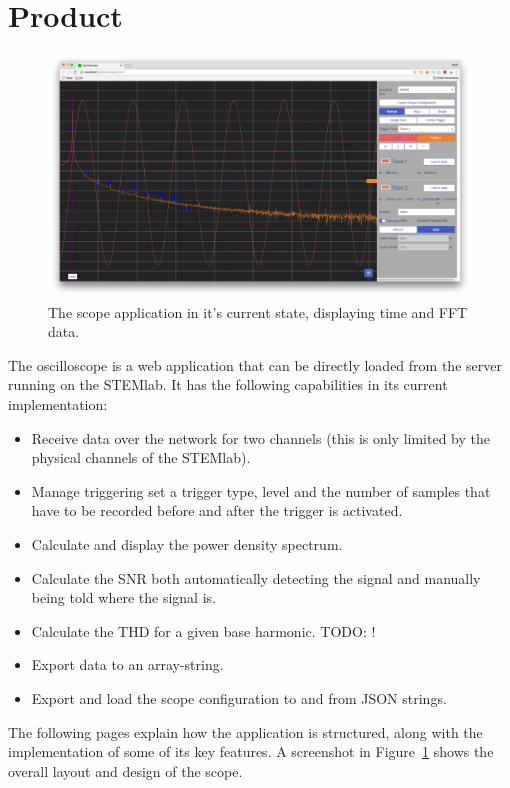 %
%
\section{Product} %
\label{sec:gui:product}

\begin{figure}
    \centering
    \includegraphics[width=1\textwidth]{images/gui/scope}
    \caption[The scope application]{%
        The scope application in it's current state, displaying time and FFT data.%
    }
    \label{fig:gui:screenshot}
\end{figure}

The oscilloscope  is a web  application that can  be directly loaded  from the
server  running on  the  STEMlab. It  has the  following  capabilities in  its
current implementation:
\begin{itemize}\tightlist
    \item 
        Receive data over  the network for two channels (this  is only limited
        by the physical channels of the STEMlab).
    \item 
        Manage triggering set a trigger type,  level and the number of samples
        that have to be recorded before and after the trigger is activated.
    \item 
        Calculate and display the power density spectrum.
    \item 
        Calculate the SNR both automatically detecting the signal and manually
        being told where the signal is.
    \item 
        Calculate the THD for a given base harmonic. TODO: !
    \item 
        Export data to an array-string.
    \item 
        Export and load the scope configuration to and from JSON strings.
\end{itemize}
The  following  pages  explain  how   the  application  is  structured,  along
with  the  implementation  of  some  of  its  key  features. A  screenshot  in
Figure~\ref{fig:gui:screenshot}  shows the  overall layout  and design  of the
scope.


